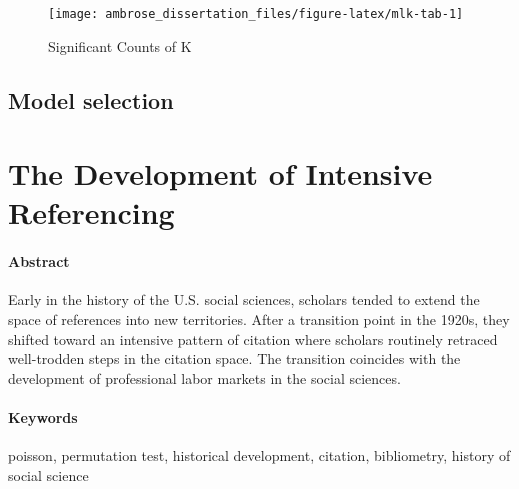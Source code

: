 \documentclass[]{book}
\theoremstyle{definition}
\theoremstyle{definition}
\theoremstyle{definition}
\theoremstyle{remark}
\begin{document}
\begin{figure}

{\centering \texttt{[image: ambrose\_dissertation\_files/figure-latex/mlk-tab-1]} 

}

\caption{Significant Counts of K}\label{fig:mlk-tab}
\end{figure}

\hypertarget{model-selection}{%
\section{Model selection}\label{model-selection}}

\hypertarget{ten}{%
\chapter{The Development of Intensive Referencing}\label{ten}}

\hypertarget{abstract-4}{%
\subsubsection*{Abstract}\label{abstract-4}}


Early in the history of the U.S. social sciences, scholars
tended to extend the space of references into new territories. After a
transition point in the 1920s, they shifted toward an intensive pattern
of citation where scholars routinely retraced well-trodden steps in the
citation space. The transition coincides with the development of
professional labor markets in the social sciences.

\hypertarget{keywords-4}{%
\subsubsection*{Keywords}\label{keywords-4}}


poisson, permutation test, historical development,
citation, bibliometry, history of social science
\end{document}
